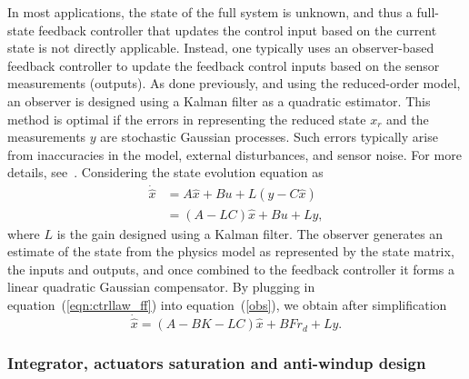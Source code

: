 \documentclass[12pt]{iopart}
\begin{document}
In most applications, the state of the full system is unknown, and thus a full-state feedback controller that updates the control input based on the current state is not directly applicable. Instead, one typically uses an observer-based feedback controller to update the feedback control inputs based on the sensor measurements (outputs).
As done previously, and using the reduced-order model, an observer is designed using a Kalman filter as a quadratic estimator. This method is optimal if the errors in representing the reduced state $x_r$ and the measurements $y$ are stochastic Gaussian processes. 
Such errors typically arise from inaccuracies in the model, external disturbances, and sensor noise. For more details, see~\cite{SandP, AandM, Stengel}. 
Considering the state evolution equation as
\begin{equation}
	\begin{split}
		\dot{\hat{x}} &=  A \hat{x} + B u + L (y - C \hat{x}) \\
			&= (A- L C) \hat{x} + B u + L y,
		\label{obs}
	\end{split}
\end{equation}
 where $L$ is the gain designed using a Kalman filter.    
The observer generates an estimate of the state from the physics model as represented by the state matrix, the inputs and outputs, and once combined to the feedback controller it forms a linear quadratic Gaussian compensator.
By plugging in equation~(\ref{eqn:ctrllaw_ff}) into equation~(\ref{obs}), we obtain after simplification
\begin{equation}
      \dot{\hat{x}} =  (A- B K  -L C) \hat{x} + B F r_{d} + L y.
\end{equation}


\subsubsection{Integrator, actuators saturation and anti-windup design} 
\end{document}
